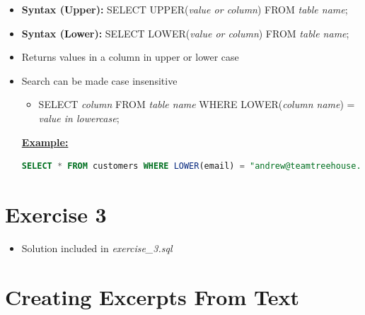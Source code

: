 \documentclass[12pt]{article}
\begin{document}
\bigskip

\begin{itemize}
    \item \textbf{Syntax (Upper):} SELECT UPPER(\textit{value or column}) FROM \textit{table name};
    \item \textbf{Syntax (Lower):} SELECT LOWER(\textit{value or column}) FROM \textit{table name};
    \item Returns values in a column in upper or lower case
    \item Search can be made case insensitive
    \begin{itemize}
        \item SELECT \textit{column} FROM \textit{table name} WHERE LOWER(\textit{column name}) = \textit{value in lowercase};
    \end{itemize}

    \bigskip

    \underline{\textbf{Example:}}

    \bigskip

    \begin{lstlisting}[language=SQL]
    SELECT * FROM customers WHERE LOWER(email) = "andrew@teamtreehouse.com";
    \end{lstlisting}

\end{itemize}

\bigskip

\section{Exercise 3}

\bigskip

\begin{itemize}
    \item Solution included in \textit{exercise\_3.sql}
\end{itemize}

\bigskip

\section{Creating Excerpts From Text}

\bigskip
\end{document}
